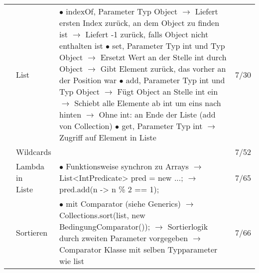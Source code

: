 \documentclass[11pt,a4paper]{article}
\begin{document}
\begin{center}
\begin{longtable}[h]{ | p{2.3cm} | p{2.3cm} | p{12.6cm} | p{1.2cm} | }
	
	& List & \makecell[l]{
	$\bullet$ indexOf, Parameter Typ Object \\
	\hspace{0.4cm} $\rightarrow$ Liefert ersten Index zurück, an dem Object zu finden ist \\
	\hspace{0.4cm} $\rightarrow$ Liefert -1 zurück, falls Object nicht enthalten ist\\
	$\bullet$ set, Parameter Typ int und Typ Object \\ 
	\hspace{0.4cm} $\rightarrow$ Ersetzt Wert an der Stelle int durch Object \\
	\hspace{0.4cm} $\rightarrow$ Gibt Element zurück, das vorher an der Position war \\
	$\bullet$ add, Parameter Typ int und Typ Object \\
	\hspace{0.4cm} $\rightarrow$ Fügt Object an Stelle int ein \\
	\hspace{0.4cm} $\rightarrow$ Schiebt alle Elemente ab int um eins nach hinten \\
	\hspace{0.4cm} $\rightarrow$ Ohne int: an Ende der Liste (add von Collection) \\
	$\bullet$ get, Parameter Typ int \\
	\hspace{0.4cm} $\rightarrow$ Zugriff auf Element in Liste}  & 7/30 \\ \cline{2-4}
	
	& Wildcards & \makecell[l]{$\bullet$ Funktionsweise synchron zu Generics (siehe Generics }  & 7/52 \\ \cline{2-4}
	
	& \makecell[l]{Lambda in \\ Liste} & \makecell[l]{$\bullet$ Funktionsweise synchron zu Arrays \\
	\hspace{0.4cm} $\rightarrow$ List<IntPredicate> pred = new ...; \\
	\hspace{0.4cm} $\rightarrow$ pred.add(n -> n \% 2 == 1); }  & 7/65 \\ \cline{2-4}
	
	& Sortieren & \makecell[l]{$\bullet$  mit Comparator (siehe Generics) \\ 
	\hspace{0.4cm} $\rightarrow$ Collections.sort(list, new BedingungComparator()); \\
	\hspace{0.4cm} $\rightarrow$ Sortierlogik durch zweiten Parameter vorgegeben \\
	\hspace{0.4cm} $\rightarrow$ Comparator Klasse mit selben Typparameter wie list}  & 7/66 \\ \cline{2-4}
	

\end{longtable}
\end{center}
\end{document}
